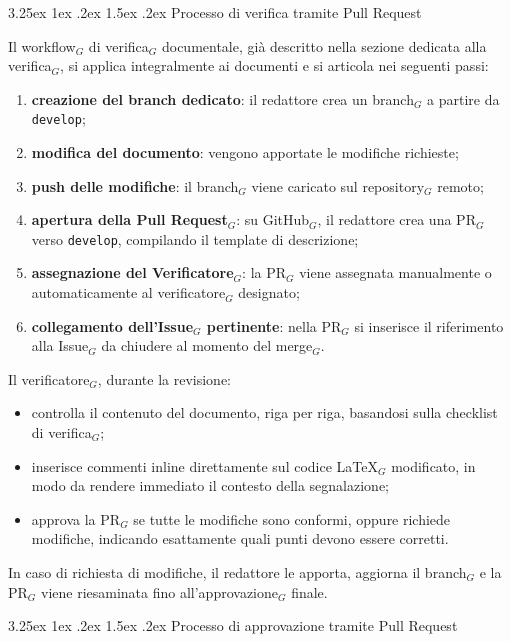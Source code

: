 \documentclass[a4paper, 10pt]{article}
\makeatletter
\renewcommand\paragraph{\@startsection{paragraph}{4}{\z@}%
  {3.25ex \@plus1ex \@minus .2ex}%
  {1.5ex \@plus .2ex}%
  {\normalfont\normalsize\bfseries}}
\makeatother
\begin{document}
\paragraph{Processo di verifica tramite Pull Request}

Il workflow$_G$ di verifica$_G$ documentale, già descritto nella sezione dedicata alla verifica$_G$, si applica integralmente ai documenti e si articola nei seguenti passi:
\begin{enumerate}
    \item \textbf{creazione del branch dedicato}: il redattore crea un branch$_G$ a partire da \texttt{develop};
    \item \textbf{modifica del documento}: vengono apportate le modifiche richieste;
    \item \textbf{push delle modifiche}: il branch$_G$ viene caricato sul repository$_G$ remoto;
    \item \textbf{apertura della Pull Request$_G$}: su GitHub$_G$, il redattore crea una PR$_G$ verso \texttt{develop}, compilando il template di descrizione;
    \item \textbf{assegnazione del Verificatore$_G$}: la PR$_G$ viene assegnata manualmente o automaticamente al verificatore$_G$ designato;
    \item \textbf{collegamento dell'Issue$_G$ pertinente}: nella PR$_G$ si inserisce il riferimento alla Issue$_G$ da chiudere al momento del merge$_G$.
\end{enumerate}

Il verificatore$_G$, durante la revisione:
\begin{itemize}
    \item controlla il contenuto del documento, riga per riga, basandosi sulla checklist di verifica$_G$;
    \item inserisce commenti inline direttamente sul codice \LaTeX$_G$ modificato, in modo da rendere immediato il contesto della segnalazione;
    \item approva la PR$_G$ se tutte le modifiche sono conformi, oppure richiede modifiche, indicando esattamente quali punti devono essere corretti.
\end{itemize}
In caso di richiesta di modifiche, il redattore le apporta, aggiorna il branch$_G$ e la PR$_G$ viene riesaminata fino all'approvazione$_G$ finale.

\paragraph{Processo di approvazione tramite Pull Request}
\end{document}
